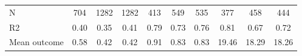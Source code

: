 \begin{tabular}{lccc|ccc|ccc}
N           &         704         &        1282         &        1282         &         413         &         549         &         535         &         377         &         458         &         444         \\
R2          &        0.40         &        0.35         &        0.41         &        0.79         &        0.73         &        0.76         &        0.81         &        0.67         &        0.72         \\
Mean outcome&        0.58         &        0.42         &        0.42         &        0.91         &        0.83         &        0.83         &       19.46         &       18.29         &       18.26         \\
\bottomrule \end{tabular}
